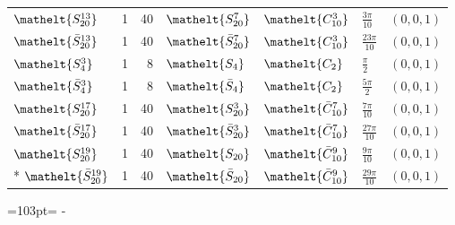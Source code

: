 \documentclass[10pt,a4paper]{article}
\newcommand{\needspace}[1]{\par\penalty-100\begingroup\dimen0=#1\relax\dimen2=\pagegoal
  \advance\dimen2-\pagetotal\ifdim\dimen0>\dimen2\relax\ifdim\dimen2>0pt\vfil\break\fi\fi
  \endgroup}
\numberwithin{equation}{section}
\newcommand{\eltfont}[1]{{\let\sigma\eltsigma\mathelt{#1}}}
\newcommand{\cls}[1]{\eltfont{#1}}
\newcommand{\dirvec}[3]{(#1, #2, #3)}
\newcommand{\barred}[1]{\bar{#1}}
\begin{document}
{\begin{longtable}{@{}lrrllll@{}}
$\cls{S_{20}^{13}}$ & 1 & 40 & $\cls{S_{20}^{7}}$ & $\cls{C_{10}^{3}}$ & $\tfrac{3\pi}{10}$ & $\dirvec{0}{0}{1}$\\
$\cls{\barred{S}_{20}^{13}}$ & 1 & 40 & $\cls{\barred{S}_{20}^{7}}$ & $\cls{C_{10}^{3}}$ & $\tfrac{23\pi}{10}$ & $\dirvec{0}{0}{1}$\\
$\cls{S_{4}^{3}}$ & 1 & 8 & $\cls{S_{4}}$ & $\cls{C_{2}}$ & $\tfrac{\pi}{2}$ & $\dirvec{0}{0}{1}$\\
$\cls{\barred{S}_{4}^{3}}$ & 1 & 8 & $\cls{\barred{S}_{4}}$ & $\cls{C_{2}}$ & $\tfrac{5\pi}{2}$ & $\dirvec{0}{0}{1}$\\
$\cls{S_{20}^{17}}$ & 1 & 40 & $\cls{S_{20}^{3}}$ & $\cls{\barred{C}_{10}^{7}}$ & $\tfrac{7\pi}{10}$ & $\dirvec{0}{0}{1}$\\
$\cls{\barred{S}_{20}^{17}}$ & 1 & 40 & $\cls{\barred{S}_{20}^{3}}$ & $\cls{\barred{C}_{10}^{7}}$ & $\tfrac{27\pi}{10}$ & $\dirvec{0}{0}{1}$\\
$\cls{S_{20}^{19}}$ & 1 & 40 & $\cls{S_{20}}$ & $\cls{\barred{C}_{10}^{9}}$ & $\tfrac{9\pi}{10}$ & $\dirvec{0}{0}{1}$\\*
$\cls{\barred{S}_{20}^{19}}$ & 1 & 40 & $\cls{\barred{S}_{20}}$ & $\cls{\barred{C}_{10}^{9}}$ & $\tfrac{29\pi}{10}$ & $\dirvec{0}{0}{1}$\\
\bottomrule\end{longtable}}
\needspace{103pt}
\end{document}
